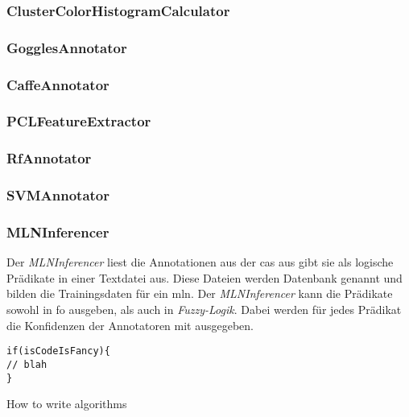 \subsubsection{ClusterColorHistogramCalculator}

\subsubsection{GogglesAnnotator}

\subsubsection{CaffeAnnotator}

\subsubsection{PCLFeatureExtractor}

\subsubsection{RfAnnotator}

\subsubsection{SVMAnnotator}

\subsubsection{MLNInferencer}
Der \textit{MLNInferencer} liest die Annotationen aus der \gls{cas} aus gibt sie als logische Prädikate in einer Textdatei aus. Diese Dateien werden Datenbank genannt und bilden die Trainingsdaten für ein \gls{mln}. Der \textit{MLNInferencer} kann die Prädikate sowohl in \gls{fo} ausgeben, als auch in \textit{Fuzzy-Logik}. Dabei werden für jedes Prädikat die Konfidenzen der Annotatoren mit ausgegeben.

\begin{algorithm}[H]
\begin{lstlisting}
if(isCodeIsFancy){
// blah
}
\end{lstlisting}
 \caption{How to write algorithms}
\end{algorithm}
